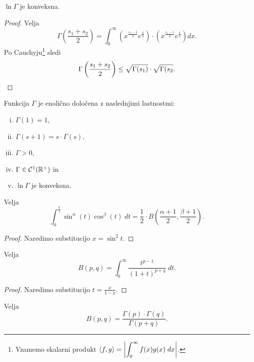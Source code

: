 \begin{posledica}
$\ln\Gamma$ je konveksna.
\end{posledica}

\begin{proof}
Velja
\[
\Gamma\left(\frac{s_1 + s_2}{2}\right) =
\int_0^\infty \left(x^{\frac{s_1-1}{2}} e^{\frac{x}{2}}\right)
\cdot \left(x^{\frac{s_1-1}{2}} e^{\frac{x}{2}}\right)dx.
\]
Po Cauchyju\footnote{Vzamemo skalarni produkt
$\displaystyle\left\langle f,g\right\rangle = \left\lvert \int_0^\infty f(x)g(x)\;dx\right\rvert$.}
sledi
\[
\Gamma\left(\frac{s_1 + s_2}{2}\right) \leq
\sqrt{\Gamma(s_1)} \cdot \sqrt{\Gamma(s_2}. \qedhere
\]
\end{proof}

\begin{opomba}
Funkcija $\Gamma$ je enolično določena z naslednjimi lastnostmi:

\begin{enumerate}[i)]
\item $\Gamma(1) = 1$,
\item $\Gamma(s+1) = s \cdot \Gamma(s)$,
\item $\Gamma > 0$,
\item $\Gamma \in \mathcal{C}^1(\mathbb{R}^+)$ in
\item $\ln\Gamma$ je konveksna.
\end{enumerate}
\end{opomba}

\begin{trditev}
Velja
\[
\int_0^{\frac{\pi}{2}} \sin^\alpha(t) \cos^\beta(t)\;dt =
\frac{1}{2} \cdot
B\left(\frac{\alpha+1}{2}, \frac{\beta+1}{2}\right).
\]
\end{trditev}

\begin{proof}
Naredimo substitucijo $x = \sin^2 t$.
\end{proof}

\begin{trditev}
Velja
\[
B(p,q) = \int_0^\infty \frac{t^{p-1}}{(1+t)^{p+q}}\;dt.
\]
\end{trditev}

\begin{proof}
Naredimo substitucijo $t = \frac{x}{1-x}$.
\end{proof}

\begin{izrek}
Velja
\[
B(p,q) = \frac{\Gamma(p) \cdot \Gamma(q)}{\Gamma(p+q)}.
\]
\end{izrek}

